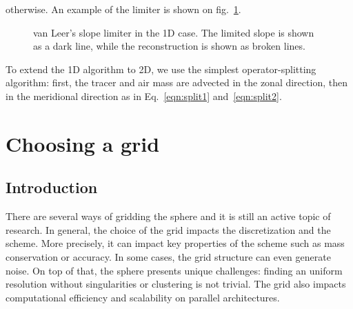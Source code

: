 otherwise. An example of the limiter is shown on fig.~\ref{fig:slope_limit}.
\begin{figure}
  \hfill
  \caption{van Leer's slope limiter in the 1D case. The limited slope is shown
  as a dark line, while the reconstruction is shown as broken lines.}
  \label{fig:slope_limit}
\end{figure}

To extend the 1D algorithm to 2D, we use the simplest operator-splitting algorithm:
first, the tracer and air mass are advected in the zonal direction, then in the meridional
direction as in Eq.~\eqref{eqn:split1}
and~\eqref{eqn:split2}.

\section{Choosing a grid}
\label{sec:grids}
\subsection{Introduction}
There are several ways of gridding the sphere and it is still an active topic of
research. In general, the choice of the grid impacts the discretization and the
scheme. More precisely, it can impact key properties of the scheme such as mass
conservation or accuracy.  In some cases, the grid structure can even generate
noise. On top of that, the sphere presents unique challenges: finding an uniform
resolution without singularities or clustering is not trivial. The grid also
impacts computational efficiency and scalability on parallel architectures.

